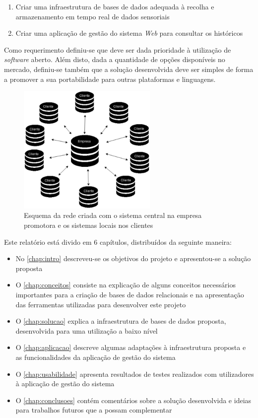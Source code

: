 \documentclass[11pt,twoside,a4paper]{report}
\begin{document}
\begin{enumerate}
	\item Criar uma infraestrutura de bases de dados adequada à recolha e armazenamento em tempo real de dados sensoriais
	\item Criar uma aplicação de gestão do sistema \textit{Web} para consultar os históricos
\end{enumerate}
Como requerimento definiu-se que deve ser dada prioridade à utilização de \textit{software} aberto. Além disto, dada a quantidade de opções disponíveis no mercado, definiu-se também que a solução desenvolvida deve ser simples de forma a promover a sua portabilidade para outras plataformas e linguagens.
\begin{figure}[H]
	\begin{center}
		\includegraphics[width=0.6\textwidth]{Esquema_Rede} %
		\caption[Esquema de rede]{Esquema da rede criada com o sistema central na empresa promotora e os sistemas locais nos clientes\footnotemark}
		\label{fig:intro1}
	\end{center}
\end{figure}
Este relatório está divido em 6 capítulos, distribuídos da seguinte maneira:
\begin{itemize}
	\item No \autoref{chap:intro} descreveu-se os objetivos do projeto e apresentou-se a solução proposta
	\item O \autoref{chap:conceitos} consiste na explicação de alguns conceitos necessários importantes para a criação de bases de dados relacionais e na apresentação das ferramentas utilizadas para desenvolver este projeto
	\item O \autoref{chap:solucao} explica a infraestrutura de bases de dados proposta, desenvolvida para uma utilização a baixo nível
	\item O \autoref{chap:aplicacao} descreve algumas adaptações à infraestrutura proposta e as funcionalidades da aplicação de gestão do sistema
	\item O \autoref{chap:usabilidade} apresenta resultados de testes realizados com utilizadores à aplicação de gestão do sistema
	\item O \autoref{chap:conclusoes} contém comentários sobre a solução desenvolvida e ideias para trabalhos futuros que a possam complementar
\end{itemize}
\end{document}
